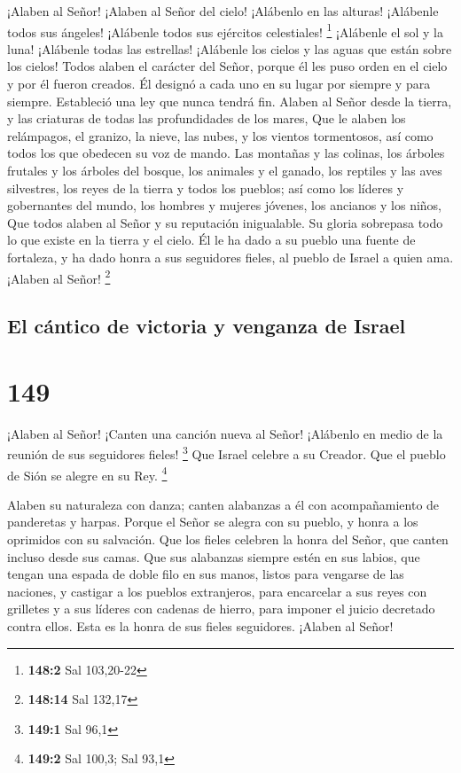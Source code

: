  ¡Alaben al Señor! ¡Alaben al Señor del cielo! ¡Alábenlo en
las alturas!  ¡Alábenle todos sus ángeles! ¡Alábenle todos
sus ejércitos celestiales! \footnote{\textbf{148:2} Sal 103,20-22}
 ¡Alábenle el sol y la luna! ¡Alábenle todas las estrellas!
 ¡Alábenle los cielos y las aguas que están sobre los
cielos!  Todos alaben el carácter del Señor, porque él les
puso orden en el cielo y por él fueron creados.  Él designó
a cada uno en su lugar por siempre y para siempre. Estableció una ley
que nunca tendrá fin.  Alaben al Señor desde la tierra, y
las criaturas de todas las profundidades de los mares,  Que
le alaben los relámpagos, el granizo, la nieve, las nubes, y los vientos
tormentosos, así como todos los que obedecen su voz de mando.
 Las montañas y las colinas, los árboles frutales y los
árboles del bosque,  los animales y el ganado, los reptiles
y las aves silvestres,  los reyes de la tierra y todos los
pueblos; así como los líderes y gobernantes del mundo,  los
hombres y mujeres jóvenes, los ancianos y los niños,  Que
todos alaben al Señor y su reputación inigualable. Su gloria sobrepasa
todo lo que existe en la tierra y el cielo.  Él le ha dado
a su pueblo una fuente de fortaleza, y ha dado honra a sus seguidores
fieles, al pueblo de Israel a quien ama. ¡Alaben al Señor! \footnote{\textbf{148:14}
  Sal 132,17}

\hypertarget{el-cuxe1ntico-de-victoria-y-venganza-de-israel}{%
\subsection{El cántico de victoria y venganza de
Israel}\label{el-cuxe1ntico-de-victoria-y-venganza-de-israel}}

\hypertarget{section-148}{%
\section{149}\label{section-148}}

 ¡Alaben al Señor! ¡Canten una canción nueva al Señor!
¡Alábenlo en medio de la reunión de sus seguidores fieles! \footnote{\textbf{149:1}
  Sal 96,1}  Que Israel celebre a su Creador. Que el pueblo
de Sión se alegre en su Rey. \footnote{\textbf{149:2} Sal 100,3; Sal
  93,1}

 Alaben su naturaleza con danza; canten alabanzas a él con
acompañamiento de panderetas y harpas.  Porque el Señor se
alegra con su pueblo, y honra a los oprimidos con su salvación.
 Que los fieles celebren la honra del Señor, que canten
incluso desde sus camas.  Que sus alabanzas siempre estén en
sus labios, que tengan una espada de doble filo en sus manos,
 listos para vengarse de las naciones, y castigar a los
pueblos extranjeros,  para encarcelar a sus reyes con
grilletes y a sus líderes con cadenas de hierro,  para
imponer el juicio decretado contra ellos. Esta es la honra de sus fieles
seguidores. ¡Alaben al Señor!

